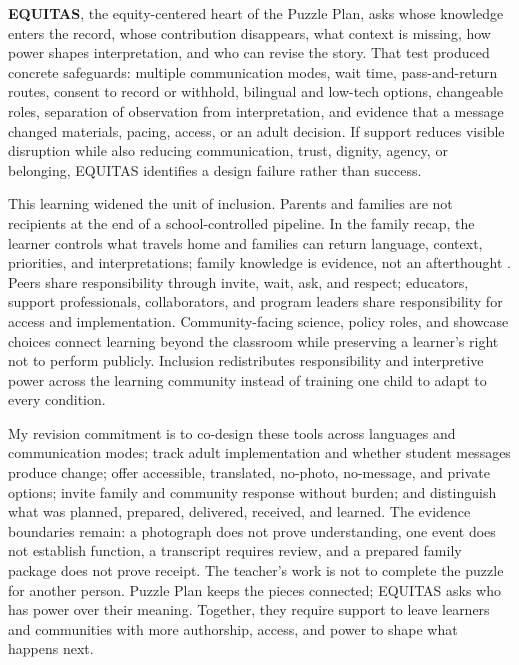 \documentclass[11pt]{article}
\newcommand{\toolsection}[1]{%
  \Needspace{4\baselineskip}
  \vspace{0.065in}\noindent{\normalsize\bfseries\color{PrimaryRed}#1}
  \par\vspace{0.02in}
}
\begin{document}
\textbf{EQUITAS}, the equity-centered heart of the Puzzle Plan, asks whose knowledge enters the record, whose contribution disappears, what context is missing, how power shapes interpretation, and who can revise the story. That test produced concrete safeguards: multiple communication modes, wait time, pass-and-return routes, consent to record or withhold, bilingual and low-tech options, changeable roles, separation of observation from interpretation, and evidence that a message changed materials, pacing, access, or an adult decision. If support reduces visible disruption while also reducing communication, trust, dignity, agency, or belonging, EQUITAS identifies a design failure rather than success.

\toolsection{Families, Community, and Revision Commitments}

This learning widened the unit of inclusion. Parents and families are not recipients at the end of a school-controlled pipeline. In the family recap, the learner controls what travels home and families can return language, context, priorities, and interpretations; family knowledge is evidence, not an afterthought \citep{zacarian2015community}. Peers share responsibility through invite, wait, ask, and respect; educators, support professionals, collaborators, and program leaders share responsibility for access and implementation. Community-facing science, policy roles, and showcase choices connect learning beyond the classroom while preserving a learner's right not to perform publicly. Inclusion redistributes responsibility and interpretive power across the learning community instead of training one child to adapt to every condition.

My revision commitment is to co-design these tools across languages and communication modes; track adult implementation and whether student messages produce change; offer accessible, translated, no-photo, no-message, and private options; invite family and community response without burden; and distinguish what was planned, prepared, delivered, received, and learned. The evidence boundaries remain: a photograph does not prove understanding, one event does not establish function, a transcript requires review, and a prepared family package does not prove receipt. The teacher's work is not to complete the puzzle for another person. Puzzle Plan keeps the pieces connected; EQUITAS asks who has power over their meaning. Together, they require support to leave learners and communities with more authorship, access, and power to shape what happens next.

\endgroup
\clearpage

\end{document}
